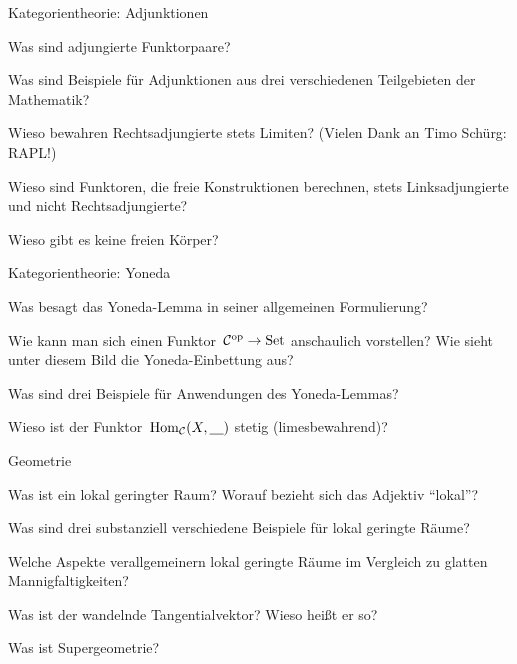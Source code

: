 \documentclass{uebblatt}
\begin{document}
\begin{aufgabeE}{Kategorientheorie: Adjunktionen}
\item Was sind adjungierte Funktorpaare?
\item Was sind Beispiele für Adjunktionen aus drei verschiedenen Teilgebieten
der Mathematik?
\item Wieso bewahren Rechtsadjungierte stets Limiten? (Vielen Dank an Timo
Schürg: RAPL!)
\item Wieso sind Funktoren, die freie Konstruktionen berechnen, stets
Linksadjungierte und nicht Rechtsadjungierte?
\item Wieso gibt es keine freien Körper?
\end{aufgabeE}

\begin{aufgabeE}{Kategorientheorie: Yoneda}
\item Was besagt das Yoneda-Lemma in seiner allgemeinen Formulierung?
\item Wie kann man sich einen Funktor~$\mathcal{C}^{\mathrm{op}} \to \mathrm{Set}$ anschaulich vorstellen?
Wie sieht unter diesem Bild die Yoneda-Einbettung aus?
\item Was sind drei Beispiele für Anwendungen des Yoneda-Lemmas?
\item Wieso ist der Funktor~$\mathrm{Hom}_{\mathcal{C}}(X,\underline{\quad})$ stetig (limesbewahrend)?
\end{aufgabeE}

\begin{aufgabeE}{Geometrie}
\item Was ist ein lokal geringter Raum? Worauf bezieht sich das Adjektiv
"`lokal"'?
\item Was sind drei substanziell verschiedene Beispiele für lokal geringte Räume?
\item Welche Aspekte verallgemeinern lokal geringte Räume im Vergleich zu
glatten Mannigfaltigkeiten?
\item Was ist der wandelnde Tangentialvektor? Wieso heißt er so?
\item Was ist Supergeometrie?
\end{aufgabeE}
\end{document}
